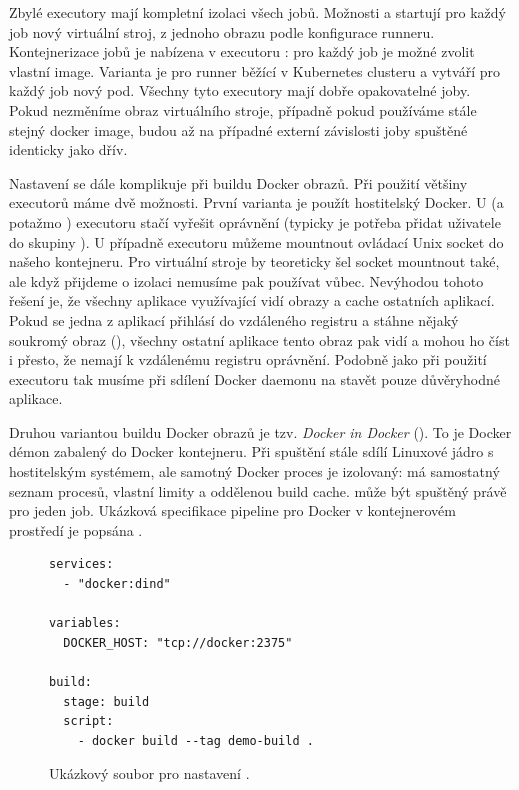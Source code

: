         Zbylé executory mají kompletní izolaci všech jobů. Možnosti  a  startují pro každý job nový virtuální stroj, z jednoho obrazu podle konfigurace runneru. Kontejnerizace jobů je nabízena v executoru : pro každý job je možné zvolit vlastní image. Varianta  je pro runner běžící v Kubernetes clusteru a vytváří pro každý job nový pod. Všechny tyto executory mají dobře opakovatelné joby. Pokud nezměníme obraz virtuálního stroje, případně pokud používáme stále stejný docker image, budou až na případné externí závislosti joby spuštěné identicky jako dřív.

        \label{sec:gitlab-ci-docker}
        Nastavení \CI se dále komplikuje při buildu Docker obrazů. Při použití většiny executorů máme dvě možnosti. První varianta je použít hostitelský Docker. U  (a potažmo ) executoru stačí vyřešit oprávnění (typicky je potřeba přidat uživatele  do skupiny ). U  případně  executoru můžeme mountnout ovládací Unix socket  do našeho kontejneru. Pro virtuální stroje by teoreticky šel socket mountnout také, ale když přijdeme o izolaci nemusíme pak  používat vůbec. Nevýhodou tohoto řešení je, že všechny aplikace využívající \CI vidí obrazy a cache ostatních aplikací. Pokud se jedna z aplikací přihlásí do vzdáleného registru a stáhne nějaký soukromý obraz (), všechny ostatní aplikace tento obraz pak vidí a mohou ho číst i přesto, že nemají k vzdálenému registru oprávnění. Podobně jako při použití  executoru tak musíme při sdílení Docker daemonu na \CI stavět pouze důvěryhodné aplikace.

        Druhou variantou buildu Docker obrazů je tzv. \textit{Docker in Docker} (). To je Docker démon zabalený do Docker kontejneru. Při spuštění stále sdílí Linuxové jádro s hostitelským systémem, ale samotný Docker proces je izolovaný: má samostatný seznam procesů, vlastní limity a oddělenou build cache.  může být spuštěný právě pro jeden job. Ukázková specifikace pipeline pro Docker v kontejnerovém prostředí je popsána .

        \begin{figure}[hb]
            \begin{verbatim}
services:
  - "docker:dind"

variables:
  DOCKER_HOST: "tcp://docker:2375"

build:
  stage: build
  script:
    - docker build --tag demo-build .
            \end{verbatim}
            \caption{Ukázkový soubor  pro nastavení .}
            \label{fig:gitlab-dind}
        \end{figure}

